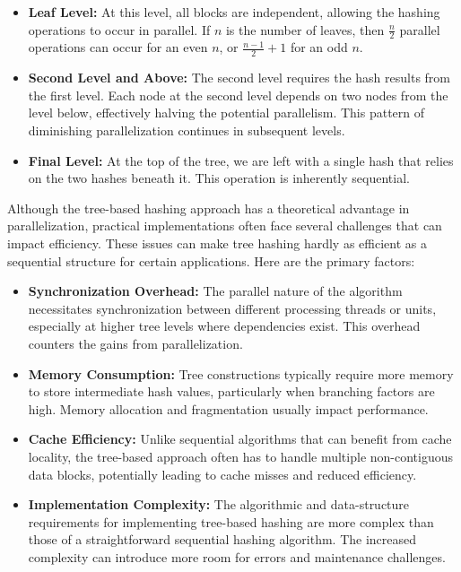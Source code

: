 \documentclass[10pt]{article}
\begin{document}
\begin{itemize}
\item \textbf{Leaf Level:} At this level, all blocks are independent, allowing the hashing operations to occur in parallel. If \( n \) is the number of leaves, then \( \frac{n}{2} \) parallel operations can occur for an even \( n \), or \( \frac{n-1}{2} + 1 \) for an odd \( n \).
\item \textbf{Second Level and Above:} The second level requires the hash results from the first level. Each node at the second level depends on two nodes from the level below, effectively halving the potential parallelism. This pattern of diminishing parallelization continues in subsequent levels.
\item \textbf{Final Level:} At the top of the tree, we are left with a single hash that relies on the two hashes beneath it. This operation is inherently sequential.
\end{itemize}

Although the tree-based hashing approach has a theoretical advantage in parallelization, practical implementations often face several challenges that can impact efficiency. These issues can make tree hashing hardly as efficient as a sequential structure for certain applications. Here are the primary factors:

\begin{itemize}
\item \textbf{Synchronization Overhead:} The parallel nature of the algorithm necessitates synchronization between different processing threads or units, especially at higher tree levels where dependencies exist. This overhead counters the gains from parallelization.
\item \textbf{Memory Consumption:} Tree constructions typically require more memory to store intermediate hash values, particularly when branching factors are high. Memory allocation and fragmentation usually impact performance.
\item \textbf{Cache Efficiency:} Unlike sequential algorithms that can benefit from cache locality, the tree-based approach often has to handle multiple non-contiguous data blocks, potentially leading to cache misses and reduced efficiency.
\item \textbf{Implementation Complexity:} The algorithmic and data-structure requirements for implementing tree-based hashing are more complex than those of a straightforward sequential hashing algorithm. The increased complexity can introduce more room for errors and maintenance challenges.
\end{itemize}
\end{document}
